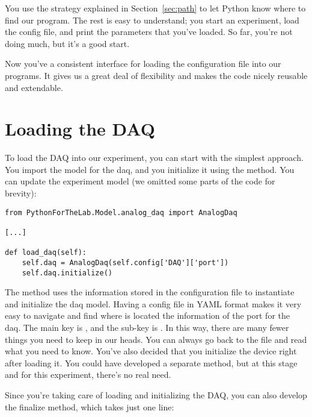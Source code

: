 You use the strategy explained in Section~\ref{sec:path} to let Python know where to find our program. The rest is easy to understand; you start an experiment, load the config file, and print the parameters that you've loaded. So far, you're not doing much, but it's a good start.

Now you've a consistent interface for loading the configuration file into our programs. It gives us a great deal of flexibility and makes the code nicely reusable and extendable.


\section{Loading the DAQ}\label{sec:loading-daq}
To load the DAQ into our experiment, you can start with the simplest approach. You import the model for the daq, and you initialize it using the  method. You can update the experiment model (we omitted some parts of the code for brevity):

\begin{verbatim}
from PythonForTheLab.Model.analog_daq import AnalogDaq

[...]

def load_daq(self):
    self.daq = AnalogDaq(self.config['DAQ']['port'])
    self.daq.initialize()
\end{verbatim}

The  method uses the information stored in the configuration file to instantiate and initialize the daq model. Having a config file in YAML format makes it very easy to navigate and find where is located the information of the port for the daq. The main key is , and the sub-key is . In this way, there are many fewer things you need to keep in our heads. You can always go back to the file and read what you need to know. You've also decided that you initialize the device right after loading it. You could have developed a separate method, but at this stage and for this experiment, there's no real need.

Since you're taking care of loading and initializing the DAQ, you can also develop the finalize method, which takes just one line:

